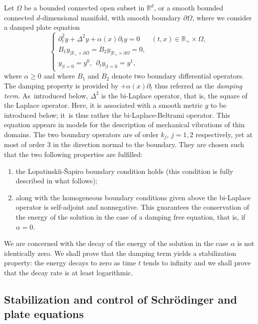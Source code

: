 \documentclass[JEP,XML,SOM,Unicode,published]{cedram}
\theoremstyle{plain}
\theoremstyle{definition}
\def\R{\mathbb{R}}
\newcommand{\LS}{Lopatinski\u{\i}-\v{S}apiro\xspace}
\begin{document}
Let $\Omega$ be a bounded connected open subset in $\R^d$, or a smooth bounded connected $d$-dimensional manifold, with smooth
boundary $\partial\Omega$, where we consider a damped plate equation
\begin{equation}\label{eq: damped plate equation - intro}
\begin{cases}
\partial^2_t y +\Delta^2y+\alpha(x)\partial_t y =0
&(t,x) \in \R_+ \times\Omega,\\
B_1 y_{|\R_+ \times\partial \Omega}= B_2y_{|\R_+ \times\partial \Omega}=0,\\
y_{|t=0}=y^0, \ \ \partial_t y_{|t=0}=y^1,
\end{cases}
\end{equation}
where $\alpha\geq 0$ and
where $B_1$ and $B_2$ denote two boundary differential operators.
The damping property is provided by $+\alpha(x)\partial_t$ thus
referred as the \emph{damping term}.
As~introduced below, $\Delta^2$ is the bi-Laplace operator, that is,
the square of the Laplace operator. Here, it is associated with a
smooth metric $g$ to be introduced below; it~is thus rather the
bi-Laplace-Beltrami operator. This equation appears in models for the description of mechanical vibrations of
thin domains. The two boundary operators are of order $k_j$, $j=1,2$ respectively, yet at most of order $3$ in the direction
normal to the boundary. They
are chosen such that the two following properties are fulfilled:
\begin{enumerate}
\item the \LS boundary condition holds (this condition is fully
described in what follows);
\item along with the homogeneous boundary conditions given above the
bi-Laplace operator is self-adjoint and nonnegative. This guarantees the
conservation of the energy of the solution in the case of a
damping free equation, that is, if $\alpha=0$.
\end{enumerate}
We are concerned with the decay of the energy of the solution in the
case $\alpha$ is not identically zero. We shall prove that the damping
term yields a stabilization property: the energy decays to zero as
time $t$ tends to infinity and we shall prove that the decay rate is at least logarithmic.

\subsection{Stabilization and control of Schrödinger and
plate equations}
\end{document}

